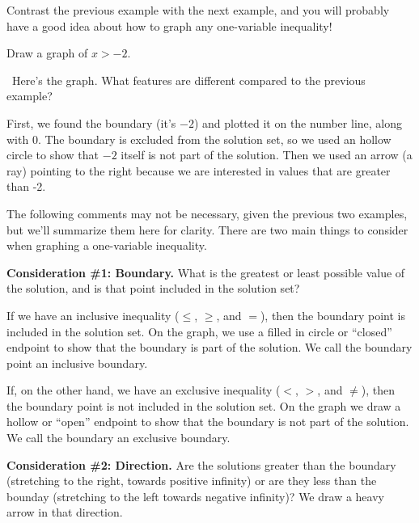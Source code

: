 Contrast the previous example with the next example, and you will probably have a good idea about how to graph any one-variable inequality!

\begin{boxedex}
Draw a graph of $x > -2$.

\exsoln\ Here's the graph. What features are different compared to the previous example?

\begin{center}
\end{center}

First, we found the boundary (it's $-2$) and plotted it on the number line, along with 0. The boundary is excluded from the solution set, so we used an hollow circle to show that $-2$ itself is not part of the solution. Then we used an arrow (a ray) pointing to the right because we are interested in values that are greater than -2.
\end{boxedex}

The following comments may not be necessary, given the previous two examples, but we'll summarize them here for clarity. There are two main things to consider when graphing a one-variable inequality.

\textbf{Consideration \#1: Boundary.} What is the greatest or least possible value of the solution, and is that point included in the solution set?

If we have an inclusive inequality ($\leq$, $\geq$, and $=$), then the boundary point is included in the solution set. On the graph, we use a filled in circle or ``closed'' endpoint to show that the boundary is part of the solution. We call the boundary point an \gls{inclusive boundary}.

If, on the other hand, we have an exclusive inequality ($<$, $>$, and $\neq$), then the boundary point is not included in the solution set. On the graph we draw a hollow or ``open'' endpoint to show that the boundary is not part of the solution. We call the boundary an \gls{exclusive boundary}.

\textbf{Consideration \#2: Direction.} Are the solutions greater than the boundary (stretching to the right, towards positive infinity) or are they less than the bounday (stretching to the left towards negative infinity)? We draw a heavy arrow in that direction.

